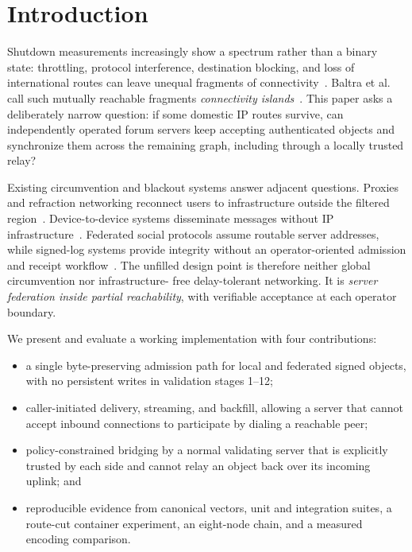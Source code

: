 \documentclass[sigconf,anonymous]{acmart}
\begin{document}

\maketitle

\section{Introduction}

Shutdown measurements increasingly show a spectrum rather than a binary state: throttling, protocol
interference, destination blocking, and loss of international routes can leave unequal fragments of
connectivity~\cite{ooni2025bangladesh,bischof2023shutdowns}. Baltra et al. call such mutually reachable
fragments \emph{connectivity islands}~\cite{baltra2024connectivity}. This paper asks a deliberately
narrow question: if some domestic IP routes survive, can independently operated forum servers keep
accepting authenticated objects and synchronize them across the remaining graph, including through
a locally trusted relay?

Existing circumvention and blackout systems answer adjacent questions. Proxies and refraction
networking reconnect users to infrastructure outside the filtered region~\cite{wustrow2011telex,
fifield2015fronting,bocovich2024snowflake}. Device-to-device systems disseminate messages without IP
infrastructure~\cite{kamali2025anix,lerner2016rangzen,pradeep2022moby,hossmann2011twimight}. Federated
social protocols assume routable server addresses, while signed-log systems provide integrity without
an operator-oriented admission and receipt workflow~\cite{activitypub,matrixspec,atproto,nostr,
tarr2019ssb}. The unfilled design point is therefore neither global circumvention nor infrastructure-
free delay-tolerant networking. It is \emph{server federation inside partial reachability}, with
verifiable acceptance at each operator boundary.

We present and evaluate a working implementation with four contributions:

\begin{itemize}
  \item a single byte-preserving admission path for local and federated signed objects, with no
        persistent writes in validation stages 1--12;
  \item caller-initiated delivery, streaming, and backfill, allowing a server that cannot accept
        inbound connections to participate by dialing a reachable peer;
  \item policy-constrained bridging by a normal validating server that is explicitly trusted by each
        side and cannot relay an object back over its incoming uplink; and
  \item reproducible evidence from canonical vectors, unit and integration suites, a route-cut
        container experiment, an eight-node chain, and a measured encoding comparison.
\end{itemize}
\end{document}
